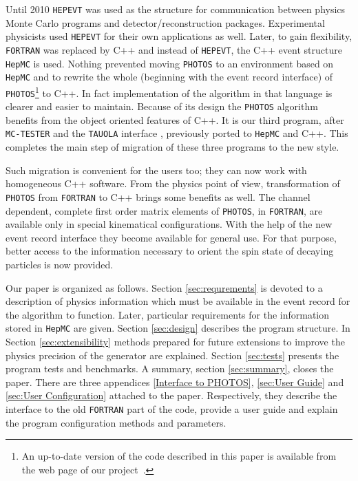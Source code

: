 \documentclass[]{Photos_interface_design}
\begin{document}
Until 2010 {\tt HEPEVT} \cite{Altarelli:1989wu} was used as the structure for 
communication between physics Monte Carlo programs and detector/reconstruction 
packages. Experimental physicists used {\tt HEPEVT} 
for their own applications  as well. Later, to gain  flexibility, {\tt FORTRAN} was replaced by C++ and 
instead of {\tt HEPEVT}, the C++ event structure  {\tt HepMC} \cite{Dobbs:2001ck}
is used. Nothing prevented 
moving {\tt PHOTOS} to an environment based on  {\tt HepMC}
and to rewrite the whole (beginning with the event record interface)
of {\tt PHOTOS}\footnote{An up-to-date version of the code described in this paper is
available from the web page of our project~\cite{photosC++}. 
  }
 to C++. In fact implementation of the algorithm in that language 
is clearer and easier to
 maintain. Because of its design the {\tt PHOTOS} algorithm benefits from the object 
oriented features of C++. It is our third program, after {\tt MC-TESTER} \cite{Davidson:2008ma}
and the {\tt TAUOLA} interface \cite{Davidson:2010rw}, previously ported to {\tt HepMC} and C++.
This completes the main step of migration of these three programs to the new style.

Such migration is convenient for the users too; they can now work
with  homogeneous C++ software. From the physics point of view, transformation 
of {\tt PHOTOS} 
from {\tt FORTRAN} to C++  brings some benefits as well.
The channel dependent, complete first order matrix elements of {\tt PHOTOS}, in {\tt FORTRAN},
 are available only 
in special
kinematical configurations. With the help of the new  event record interface they  become
available for general use.
For that purpose, better access to the information necessary to orient the spin state of decaying particles
is now provided.



Our paper is organized as follows. Section \ref{sec:requrements} is devoted
to a description of physics information which must be available in the event
record for the algorithm to function. Later, particular requirements for the 
information stored in {\tt HepMC} are given. Section \ref{sec:design} describes
the program structure. In Section \ref{sec:extensibility} methods prepared for 
future extensions to improve the physics precision of the generator are explained.
Section \ref{sec:tests} presents the program tests and benchmarks. 
A summary, section \ref{sec:summary}, closes the paper.
There are three appendices \ref{Interface to PHOTOS}, 
\ref{sec:User Guide} and \ref{sec:User Configuration} attached to the paper.
Respectively, they describe the interface to the old {\tt FORTRAN} part of the code,
provide a user guide and explain the program configuration methods and parameters. 
\end{document}
